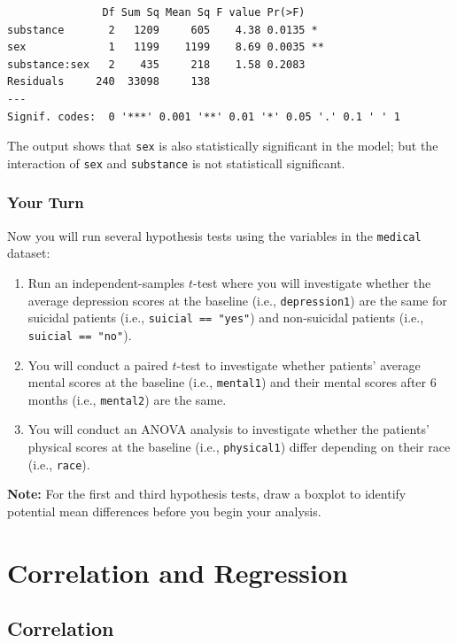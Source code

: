 \documentclass[]{book}
\begin{document}
\begin{verbatim}
               Df Sum Sq Mean Sq F value Pr(>F)   
substance       2   1209     605    4.38 0.0135 * 
sex             1   1199    1199    8.69 0.0035 **
substance:sex   2    435     218    1.58 0.2083   
Residuals     240  33098     138                  
---
Signif. codes:  0 '***' 0.001 '**' 0.01 '*' 0.05 '.' 0.1 ' ' 1
\end{verbatim}

The output shows that \texttt{sex} is also statistically significant in the model; but the interaction of \texttt{sex} and \texttt{substance} is not statisticall significant.

\hypertarget{your-turn-8}{%
\subsection{Your Turn}\label{your-turn-8}}

Now you will run several hypothesis tests using the variables in the \texttt{medical} dataset:

\begin{enumerate}
\def\labelenumi{\arabic{enumi}.}
\item
  Run an independent-samples \(t\)-test where you will investigate whether the average depression scores at the baseline (i.e., \texttt{depression1}) are the same for suicidal patients (i.e., \texttt{suicial\ ==\ "yes"}) and non-suicidal patients (i.e., \texttt{suicial\ ==\ "no"}).
\item
  You will conduct a paired \(t\)-test to investigate whether patients' average mental scores at the baseline (i.e., \texttt{mental1}) and their mental scores after 6 months (i.e., \texttt{mental2}) are the same.
\item
  You will conduct an ANOVA analysis to investigate whether the patients' physical scores at the baseline (i.e., \texttt{physical1}) differ depending on their race (i.e., \texttt{race}).
\end{enumerate}

\textbf{Note:} For the first and third hypothesis tests, draw a boxplot to identify potential mean differences before you begin your analysis.

\hypertarget{part6}{%
\chapter{Correlation and Regression}\label{part6}}

\hypertarget{correlation}{%
\section{Correlation}\label{correlation}}
\end{document}
